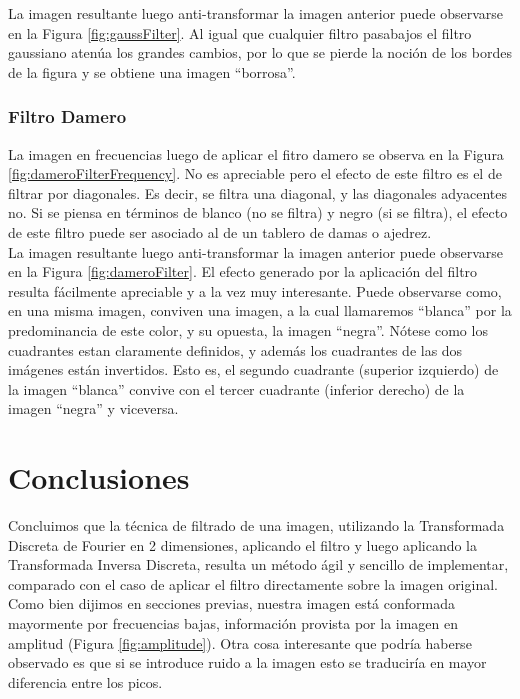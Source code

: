 \documentclass[twocolumn,a4paper,10pt]{article}
\begin{document}
La imagen resultante luego anti-transformar la imagen anterior puede observarse en la Figura \ref{fig:gaussFilter}. Al igual que cualquier filtro pasabajos
el filtro gaussiano aten\'ua los grandes cambios, por lo que se pierde la noci\'on de los bordes de la figura y se obtiene una imagen ``borrosa''.


\subsubsection{Filtro Damero}

La imagen en frecuencias luego de aplicar el fitro damero se observa en la Figura \ref{fig:dameroFilterFrequency}. No es apreciable pero el efecto de este 
filtro es el de filtrar por diagonales. Es decir, se filtra una diagonal, y las diagonales adyacentes no. Si se piensa en t\'erminos de blanco (no se filtra) y 
negro (si se filtra), el efecto de este filtro puede ser asociado al de un tablero de damas o ajedrez.\\

La imagen resultante luego anti-transformar la imagen anterior puede observarse en la Figura \ref{fig:dameroFilter}. El efecto generado por la aplicaci\'on del 
filtro resulta f\'acilmente apreciable y a la vez muy interesante. Puede observarse como, en una misma imagen, conviven una imagen, a la cual llamaremos ``blanca''
por la predominancia de este color, y su opuesta, la imagen ``negra''. 
N\'otese como los cuadrantes estan claramente definidos, y además los cuadrantes de las dos im\'agenes est\'an invertidos. Esto es, el 
segundo cuadrante (superior izquierdo) de la imagen ``blanca'' convive con el tercer cuadrante (inferior derecho) de la imagen ``negra'' y viceversa. 

\section{Conclusiones}
\label{sec:conclusiones}

Concluimos que la t\'ecnica de filtrado de una imagen, utilizando la Transformada Discreta de Fourier en 2 dimensiones, aplicando el filtro y luego aplicando la
Transformada Inversa Discreta, resulta un m\'etodo \'agil y sencillo de implementar, comparado con el caso de aplicar el filtro directamente sobre la imagen 
original. \\

Como bien dijimos en secciones previas, nuestra imagen está conformada mayormente por frecuencias bajas, informaci\'on provista por la imagen en amplitud 
(Figura \ref{fig:amplitude}). Otra cosa interesante que podría haberse observado es que si se introduce ruido a la imagen esto se traducir\'ia en mayor 
diferencia entre los picos\cite{HIPR2-FourierTransform}. \\
\end{document}
